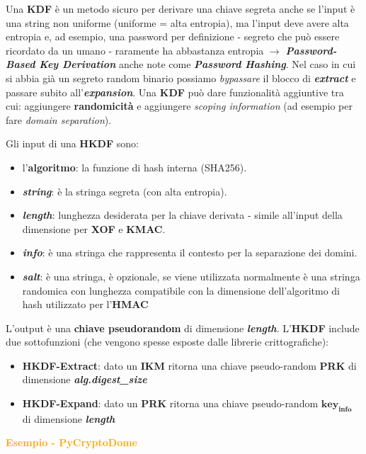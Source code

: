 \begin{flushleft}
    Una \textbf{KDF} è un metodo sicuro per derivare una chiave segreta anche se l'input è una string non uniforme (uniforme = alta entropia), ma l'input deve avere alta entropia e, ad esempio, una password per definizione - segreto che può essere ricordato da un umano - raramente ha abbastanza entropia $\rightarrow$ \textbf{\textit{Password-Based Key Derivation}} anche note come \textbf{\textit{Password Hashing}}. Nel caso in cui si abbia già un segreto random binario possiamo \textit{bypassare} il blocco di \textbf{\textit{extract}} e passare subito all'\textbf{\textit{expansion}}. Una \textbf{KDF} può dare funzionalità aggiuntive tra cui: aggiungere \textbf{randomicità} e aggiungere \textit{scoping information} (ad esempio per fare \textit{domain separation}).

    \smallskip

    Gli input di una \textbf{HKDF} sono:
    \begin{itemize}[nosep]
        \item l'\textbf{algoritmo}: la funzione di hash interna (SHA256).
        \item \textbf{\textit{string}}: è la stringa segreta (con alta entropia).
        \item \textbf{\textit{length}}: lunghezza desiderata per la chiave derivata - simile all'input della dimensione per \textbf{XOF} e \textbf{KMAC}.
        \item \textbf{\textit{info}}: è una stringa che rappresenta il contesto per la separazione dei domini.
        \item \textbf{\textit{salt}}: è una stringa, è opzionale, se viene utilizzata normalmente è una stringa randomica con lunghezza compatibile con la dimensione dell'algoritmo di hash utilizzato per l'\textbf{HMAC}
    \end{itemize}
    L'output è una \textbf{chiave pseudorandom} di dimensione \textbf{\textit{length}}.
    L'\textbf{HKDF} include due sottofunzioni (che vengono spesse esposte dalle librerie crittografiche):
    \begin{itemize}[nosep]
        \item \textbf{HKDF-Extract}: dato un \textbf{IKM} ritorna una chiave pseudo-random \textbf{PRK} di dimensione \textbf{\textit{alg.digest\_size}}
        \item \textbf{HKDF-Expand}: dato un \textbf{PRK} ritorna una chiave pseudo-random $\mathbf{key_{info}}$ di dimensione \textbf{\textit{length}}
    \end{itemize}
    \textcolor{orange}{\textbf{Esempio - PyCryptoDome}}
\end{flushleft}

